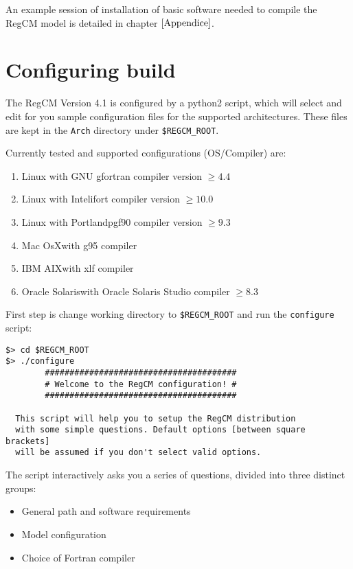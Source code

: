 An example session of installation of basic software needed to compile the
RegCM model is detailed in chapter $\ref{Appendice}$.

\section{Configuring build}

The RegCM Version 4.1 is configured by a python2 script, which will select
and edit for you sample configuration files for the supported architectures.
These files are kept in the \verb=Arch= directory under \verb=$REGCM_ROOT=.

Currently tested and supported configurations (OS/Compiler) are:

\begin{enumerate}
\item Linux with GNU gfortran compiler version $\ge 4.4$
\item Linux with Intel\texttrademark ifort compiler version $\ge 10.0$
\item Linux with Portland\texttrademark pgf90 compiler version $\ge 9.3$
\item Mac OsX\texttrademark with g95 compiler
\item IBM AIX\texttrademark with xlf compiler
\item Oracle Solaris\texttrademark with Oracle Solaris Studio\texttrademark
compiler $\ge 8.3$
\end{enumerate}

First step is change working directory to \verb=$REGCM_ROOT= and run the
\verb=configure= script:

\begin{Verbatim}
$> cd $REGCM_ROOT
$> ./configure
        #######################################
        # Welcome to the RegCM configuration! #
        #######################################

  This script will help you to setup the RegCM distribution
  with some simple questions. Default options [between square brackets] 
  will be assumed if you don't select valid options.
\end{Verbatim}

The script interactively asks you a series of questions, divided into three
distinct groups:
\begin{itemize}
\item General path and software requirements
\item Model configuration
\item Choice of Fortran compiler
\end{itemize}

